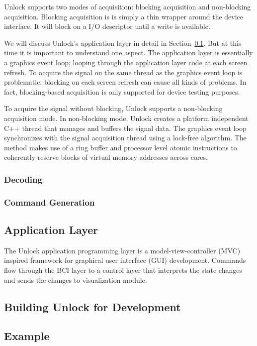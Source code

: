 \documentclass[11pt]{article}
\begin{document}
Unlock supports two modes of acquisition: blocking acquisition and non-blocking acquisition.  Blocking acquisition is is simply a thin wrapper around the device interface.  It will block on a I/O descriptor until a write is available.

We will discuss Unlock's application layer in detail in Section~\ref{applicationsec}.  But at this time it is important to understand one aspect.  The application layer is essentially a graphics event loop; looping through the application layer code at each screen refresh.  To acquire the signal on the same thread as the graphics event loop is problematic: blocking on each screen refresh can cause all kinds of problems.  In fact, blocking-based acquisition is only supported for device testing purposes. 

To acquire the signal without blocking, Unlock supports a non-blocking acquisition mode.  In non-blocking mode, Unlock creates a platform independent C++ thread that manages and buffers the signal data.  The graphics event loop synchronizes with the signal acquisition thread using a lock-free algorithm.  The method makes use of a ring buffer and processor level atomic instructions to coherently reserve blocks of virtual memory addresses across cores.

\subsubsection{Decoding}

\subsubsection{Command Generation}

\subsection{Application Layer}\label{applicationsec}

The Unlock application programming layer is a model-view-controller (MVC)~\cite{mvc, mvc2} inspired framework for graphical user interface (GUI) development.  Commands flow through the BCI layer to a control layer that interprets the state changes and sends the changes to visualization module.

\subsection{Building Unlock for Development}
\subsection{Example}
\end{document}
